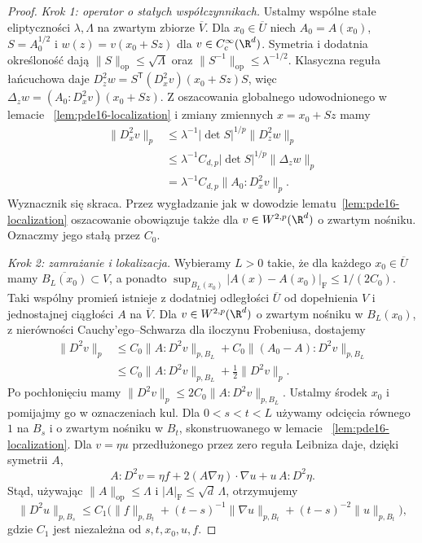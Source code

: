 \begin{proof}
\emph{Krok 1: operator o stałych współczynnikach.}
Ustalmy wspólne stałe eliptyczności $\lambda,\Lambda$
na zwartym zbiorze $\overline V$.
Dla $x_0\in\overline U$ niech $A_0=A(x_0)$,
$S=A_0^{1/2}$ i
$w(z)=v(x_0+Sz)$ dla $v\in C_c^\infty(\R^d)$.
Symetria i dodatnia określoność dają
$\|S\|_{\mathrm{op}}\le\sqrt\Lambda$ oraz
$\|S^{-1}\|_{\mathrm{op}}\le\lambda^{-1/2}$.
Klasyczna reguła łańcuchowa daje
$D_z^2w=S^{\mathsf T}(D_x^2v)(x_0+Sz)S$,
więc $\Delta_z w=(A_0:D_x^2v)(x_0+Sz)$.
Z oszacowania globalnego udowodnionego w lemacie
~\ref{lem:pde16-localization} i zmiany zmiennych
$x=x_0+Sz$ mamy
\[
 \begin{aligned}
 \|D_x^2v\|_p
 &\le\lambda^{-1}|\det S|^{1/p}\|D_z^2w\|_p\\
 &\le\lambda^{-1}C_{d,p}|\det S|^{1/p}\|\Delta_z w\|_p\\
 &=\lambda^{-1}C_{d,p}\|A_0:D_x^2v\|_p.
 \end{aligned}
\]
Wyznacznik się skraca. Przez wygładzanie jak
w dowodzie lematu~\ref{lem:pde16-localization}
oszacowanie obowiązuje także dla $v\in W^{2,p}(\R^d)$
o zwartym nośniku. Oznaczmy jego stałą przez $C_0$.

\emph{Krok 2: zamrażanie i lokalizacja.}
Wybieramy $L>0$ takie, że dla każdego
$x_0\in\overline U$ mamy $\overline{B_L(x_0)}\subset V$,
a ponadto
$\sup_{B_L(x_0)}|A(x)-A(x_0)|_{\mathrm F}\le1/(2C_0)$.
Taki wspólny promień istnieje z dodatniej odległości
$\overline U$ od dopełnienia $V$ i jednostajnej
ciągłości $A$ na $\overline V$.
Dla $v\in W^{2,p}(\R^d)$ o zwartym nośniku
w $B_L(x_0)$, z nierówności Cauchy'ego--Schwarza
dla iloczynu Frobeniusa, dostajemy
\[
 \begin{aligned}
 \|D^2v\|_p
 &\le C_0\|A:D^2v\|_{p,B_L}
      +C_0\|(A_0-A):D^2v\|_{p,B_L}\\
 &\le C_0\|A:D^2v\|_{p,B_L}+\tfrac12\|D^2v\|_p.
 \end{aligned}
\]
Po pochłonięciu mamy $\|D^2v\|_p\le
2C_0\|A:D^2v\|_{p,B_L}$.
Ustalmy środek $x_0$ i pomijajmy go w oznaczeniach kul.
Dla $0<s<t<L$ używamy odcięcia równego $1$ na $B_s$
i o zwartym nośniku w $B_t$, skonstruowanego w lemacie
~\ref{lem:pde16-localization}. Dla $v=\eta u$
przedłużonego przez zero reguła Leibniza daje,
dzięki symetrii $A$,
\[
 A:D^2v=\eta f+2(A\nabla\eta)\cdot\nabla u+u\,A:D^2\eta.
\]
Stąd, używając $\|A\|_{\mathrm{op}}\le\Lambda$
i $|A|_{\mathrm F}\le\sqrt d\,\Lambda$, otrzymujemy
\[
 \|D^2u\|_{p,B_s}\le C_1\bigl(
 \|f\|_{p,B_t}+(t-s)^{-1}\|\nabla u\|_{p,B_t}
 +(t-s)^{-2}\|u\|_{p,B_t}\bigr),
\]
gdzie $C_1$ jest niezależna od $s,t,x_0,u,f$.


\end{proof}
